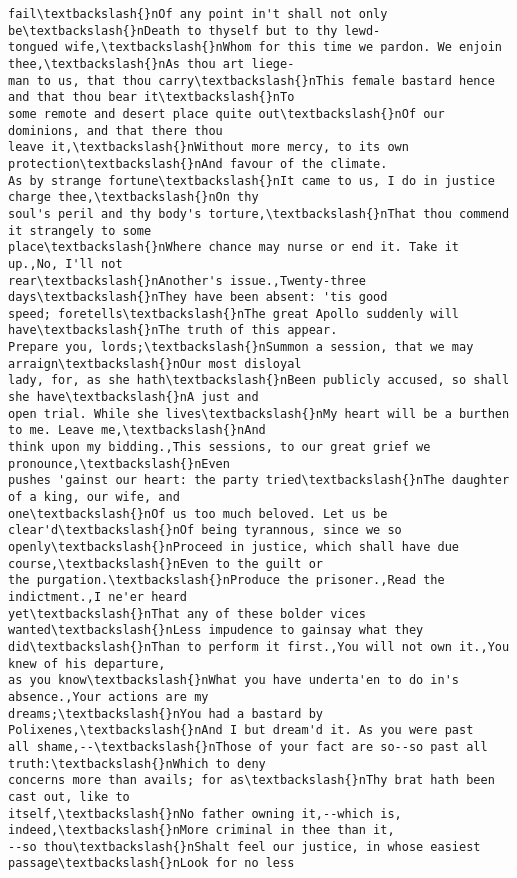 \documentclass[11pt]{article}
\begin{document}
\begin{tcolorbox}[breakable, size=fbox, boxrule=.5pt, pad at break*=1mm, opacityfill=0]
\begin{Verbatim}[commandchars=\\\{\}]
fail\textbackslash{}nOf any point in't shall not only be\textbackslash{}nDeath to thyself but to thy lewd-
tongued wife,\textbackslash{}nWhom for this time we pardon. We enjoin thee,\textbackslash{}nAs thou art liege-
man to us, that thou carry\textbackslash{}nThis female bastard hence and that thou bear it\textbackslash{}nTo
some remote and desert place quite out\textbackslash{}nOf our dominions, and that there thou
leave it,\textbackslash{}nWithout more mercy, to its own protection\textbackslash{}nAnd favour of the climate.
As by strange fortune\textbackslash{}nIt came to us, I do in justice charge thee,\textbackslash{}nOn thy
soul's peril and thy body's torture,\textbackslash{}nThat thou commend it strangely to some
place\textbackslash{}nWhere chance may nurse or end it. Take it up.,No, I'll not
rear\textbackslash{}nAnother's issue.,Twenty-three days\textbackslash{}nThey have been absent: 'tis good
speed; foretells\textbackslash{}nThe great Apollo suddenly will have\textbackslash{}nThe truth of this appear.
Prepare you, lords;\textbackslash{}nSummon a session, that we may arraign\textbackslash{}nOur most disloyal
lady, for, as she hath\textbackslash{}nBeen publicly accused, so shall she have\textbackslash{}nA just and
open trial. While she lives\textbackslash{}nMy heart will be a burthen to me. Leave me,\textbackslash{}nAnd
think upon my bidding.,This sessions, to our great grief we pronounce,\textbackslash{}nEven
pushes 'gainst our heart: the party tried\textbackslash{}nThe daughter of a king, our wife, and
one\textbackslash{}nOf us too much beloved. Let us be clear'd\textbackslash{}nOf being tyrannous, since we so
openly\textbackslash{}nProceed in justice, which shall have due course,\textbackslash{}nEven to the guilt or
the purgation.\textbackslash{}nProduce the prisoner.,Read the indictment.,I ne'er heard
yet\textbackslash{}nThat any of these bolder vices wanted\textbackslash{}nLess impudence to gainsay what they
did\textbackslash{}nThan to perform it first.,You will not own it.,You knew of his departure,
as you know\textbackslash{}nWhat you have underta'en to do in's absence.,Your actions are my
dreams;\textbackslash{}nYou had a bastard by Polixenes,\textbackslash{}nAnd I but dream'd it. As you were past
all shame,--\textbackslash{}nThose of your fact are so--so past all truth:\textbackslash{}nWhich to deny
concerns more than avails; for as\textbackslash{}nThy brat hath been cast out, like to
itself,\textbackslash{}nNo father owning it,--which is, indeed,\textbackslash{}nMore criminal in thee than it,
--so thou\textbackslash{}nShalt feel our justice, in whose easiest passage\textbackslash{}nLook for no less

\end{Verbatim}
\end{tcolorbox}
\end{document}
